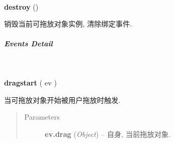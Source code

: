 \documentclass[letterpaper,10pt,english]{sphinxmanual}
\begin{document}
\begin{fulllineitems}
\label{api/component/dd/draggable:Draggable.destroy}~
\begin{DUlineblock}{0em}
\item[] \textbf{destroy} ()
\item[] 销毁当前可拖放对象实例, 清除绑定事件.
\end{DUlineblock}

\end{fulllineitems}



\subparagraph{Events Detail}
\label{api/component/dd/draggable:events-detail}

\begin{fulllineitems}
\label{api/component/dd/draggable:Draggable.dragstart}~
\begin{DUlineblock}{0em}
\item[] \textbf{dragstart} ( ev )
\item[] 当可拖放对象开始被用户拖放时触发.
\end{DUlineblock}
\begin{quote}\begin{description}
\item[{Parameters}] \leavevmode
\textbf{ev.drag} (\emph{Object}) -- 自身, 当前拖放对象.

\end{description}\end{quote}

\end{fulllineitems}


\end{document}
